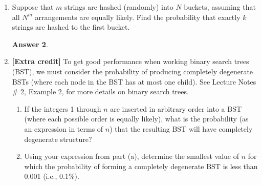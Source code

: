 \documentclass[12pt]{article}
\renewcommand{\(}{\left(}
\renewcommand{\)}{\right)}
\theoremstyle{definition}
\newtheorem*{answer}{Answer}
\begin{document}
\begin{enumerate}
\begin{enumerate}[label=\alph*.]
    \item If she tries passwords from the list at random, deleting those passwords that do not work, what is the probability that her first successful login will be (exactly) on her $k$-th try?
    \item Now say the hacker tries passwords from the list at random, but does \textbf{not} delete previously tried passwords from the list. She stops after her first successful login attempt.  What is the probability that her first successful login will be (exactly) on her $k$-th try?

    \end{enumerate}

    \begin{shaded}
    \begin{answer}

    \end{answer}
    \end{shaded}
    \newpage


\item Suppose that $m$ strings are hashed (randomly) into $N$ buckets, assuming that all $N^m$ arrangements are equally likely.  Find the probability that exactly $k$ strings are hashed to the first bucket.

    \begin{shaded}
    \begin{answer}

    \end{answer}
    \end{shaded}
    \newpage


\item \textbf{[Extra credit]} To get good performance when working binary search trees (BST), we must consider the probability of producing completely degenerate BSTs (where each node in the BST has at most one child). See Lecture Notes \# 2, Example 2, for more details on binary search trees.
    \begin{enumerate}[label=\alph*.]

    \item If the integers 1 through $n$ are inserted in arbitrary order into a BST (where each possible order is equally likely), what is the probability (as an expression in terms of $n$) that the resulting BST will have completely degenerate structure?
    \item Using your expression from part (a), determine the smallest value of $n$ for which the probability of forming a completely degenerate BST is less than 0.001 (i.e., 0.1\%).


\end{enumerate}
\end{enumerate}
\end{document}
